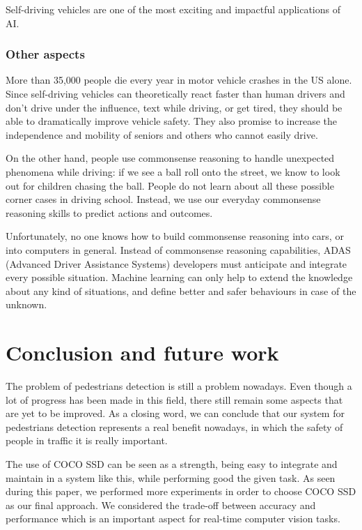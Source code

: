 \documentclass[runningheads,a4paper,11pt]{report}
\begin{document}
Self-driving vehicles are one of the most exciting and impactful applications of AI.
\label{section:discussion}
 \subsection{Other aspects}
\label{subsection:others}
More than 35,000 people die every year in motor vehicle crashes in the US alone. Since self-driving vehicles can theoretically react faster than human drivers and don't drive under the influence, text while driving, or get tired, they should be able to dramatically improve vehicle safety. They also promise to increase the independence and mobility of seniors and others who cannot easily drive. 

On the other hand, people use commonsense reasoning to handle unexpected phenomena while driving: if we see a ball roll onto the street, we know to look out for children chasing the ball. People do not learn about all these possible corner cases in driving school. Instead, we use our everyday commonsense reasoning skills to predict actions and outcomes.


Unfortunately, no one knows how to build commonsense reasoning into cars, or into computers in general.  Instead of commonsense reasoning capabilities, ADAS (Advanced Driver Assistance Systems) developers must anticipate and integrate every possible situation. Machine learning can only help to extend the knowledge about any kind of situations, and define better and safer behaviours in case of the unknown.

\chapter{Conclusion and future work}
\label{chapter:concl}

The problem of pedestrians detection is still a problem nowadays. Even though
a lot of progress has been made in this field,  there still remain some aspects that are yet to be improved.
As a closing word, we can conclude that our system for pedestrians detection represents a real benefit nowadays, in which the safety of people in traffic it is really important.

The use of COCO SSD can be seen as a strength, being easy to integrate and maintain in a system like this, while performing good the given task. As seen during this paper, we performed more experiments in order to choose COCO SSD as our final approach. We considered the trade-off between accuracy and performance which is an important aspect for real-time computer vision tasks.
 
\end{document}
